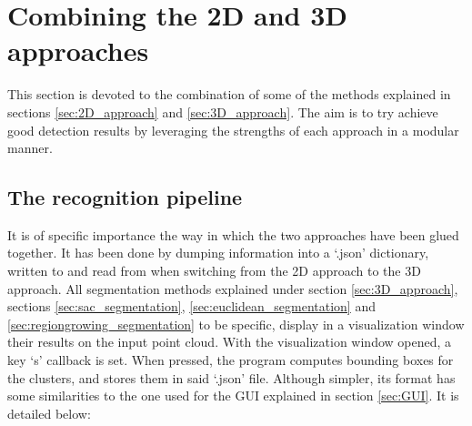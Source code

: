 \documentclass[../main.tex]{subfiles}
\begin{document}
\section{Combining the 2D and 3D approaches} \label{sec:2D_3D_approaches}
This section is devoted to the combination of some of the methods explained in sections \ref{sec:2D_approach} and \ref{sec:3D_approach}. The aim is to try achieve good detection results by leveraging the strengths of each approach in a modular manner. 

\subsection{The recognition pipeline}
It is of specific importance the way in which the two approaches have been glued together. It has been done by dumping information into a `.json' dictionary, written to and read from when switching from the 2D approach to the 3D approach. All segmentation methods explained under section \ref{sec:3D_approach}, sections \ref{sec:sac_segmentation}, \ref{sec:euclidean_segmentation} and \ref{sec:regiongrowing_segmentation} to be specific, display in a visualization window their results on the input point cloud. With the visualization window opened, a key `s' callback is set. When pressed, the program computes bounding boxes for the clusters, and stores them in said `.json' file. Although simpler, its format has some similarities to the one used for the GUI explained in section \ref{sec:GUI}. It is detailed below:
\end{document}
